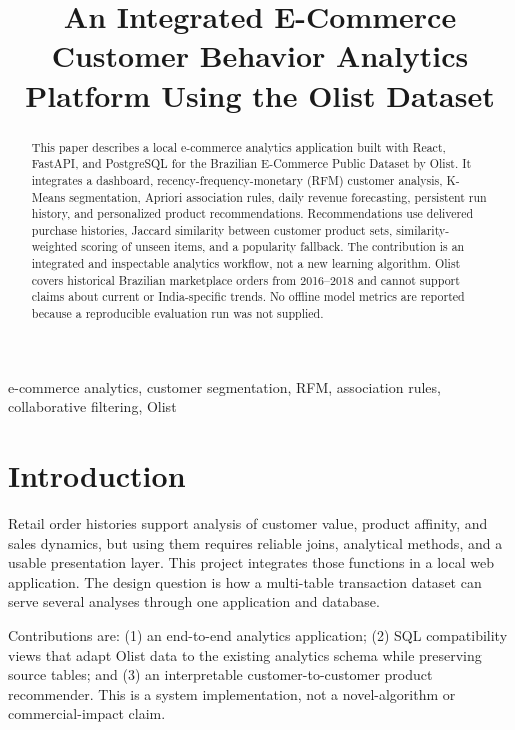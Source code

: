 \documentclass[conference]{IEEEtran}
\title{An Integrated E-Commerce Customer Behavior Analytics Platform Using the Olist Dataset}
\author{\IEEEauthorblockN{Sahil}\IEEEauthorblockA{Big Data Analytics Project\\India}}
\begin{document}
\maketitle
\begin{abstract}
This paper describes a local e-commerce analytics application built with React, FastAPI, and PostgreSQL for the Brazilian E-Commerce Public Dataset by Olist. It integrates a dashboard, recency-frequency-monetary (RFM) customer analysis, K-Means segmentation, Apriori association rules, daily revenue forecasting, persistent run history, and personalized product recommendations. Recommendations use delivered purchase histories, Jaccard similarity between customer product sets, similarity-weighted scoring of unseen items, and a popularity fallback. The contribution is an integrated and inspectable analytics workflow, not a new learning algorithm. Olist covers historical Brazilian marketplace orders from 2016--2018 and cannot support claims about current or India-specific trends. No offline model metrics are reported because a reproducible evaluation run was not supplied.
\end{abstract}
\begin{IEEEkeywords}e-commerce analytics, customer segmentation, RFM, association rules, collaborative filtering, Olist\end{IEEEkeywords}
\section{Introduction}
Retail order histories support analysis of customer value, product affinity, and sales dynamics, but using them requires reliable joins, analytical methods, and a usable presentation layer. This project integrates those functions in a local web application. The design question is how a multi-table transaction dataset can serve several analyses through one application and database.

Contributions are: (1) an end-to-end analytics application; (2) SQL compatibility views that adapt Olist data to the existing analytics schema while preserving source tables; and (3) an interpretable customer-to-customer product recommender. This is a system implementation, not a novel-algorithm or commercial-impact claim.
\end{document}
